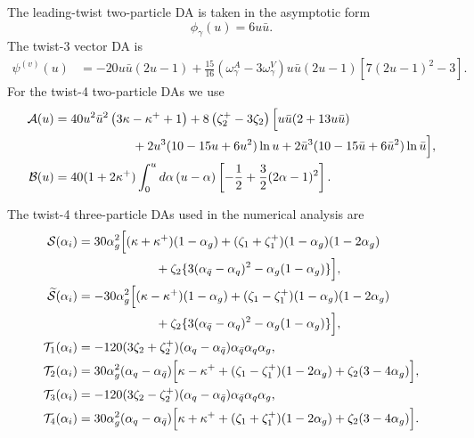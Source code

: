 \documentclass[aps,prd,preprint,nofootinbib,superscriptaddress]{revtex4-2}
\begin{document}
The leading-twist two-particle DA is taken in the asymptotic form
\begin{equation}
  \phi_\gamma(u)=6u\bar u .
  \label{eq:app-phi}
\end{equation}
The twist-3 vector DA is
\begin{align}
  \psi^{(v)}(u)
  &=
  -20u\bar u(2u-1)
  +\frac{15}{16}\left(\omega_\gamma^A-3\omega_\gamma^V\right)
  u\bar u(2u-1)\left[7(2u-1)^2-3\right].
  \label{eq:app-psiv}
\end{align}
For the twist-4 two-particle DAs we use
\begin{align}
  {\cal A}(u)
  &=
  40u^2\bar u^2\left(3\kappa-\kappa^+ +1\right)
  +8\left(\zeta_2^+-3\zeta_2\right)
  \Big[
  u\bar u(2+13u\bar u)
  \notag\\
  &\hspace{2.2cm}
  +2u^3(10-15u+6u^2)\ln u
  +2\bar u^3(10-15\bar u+6\bar u^2)\ln\bar u
  \Big],
  \label{eq:app-A}\\
  {\cal B}(u)
  &=
  40(1+2\kappa^+)
  \int_0^u d\alpha\,(u-\alpha)
  \left[-\frac12+\frac32(2\alpha-1)^2\right].
  \label{eq:app-B}
\end{align}

The twist-4 three-particle DAs used in the numerical analysis are
\begin{align}
  {\cal S}(\alpha_i)
  &=
  30\alpha_g^2
  \Big[
  (\kappa+\kappa^+)(1-\alpha_g)
  +(\zeta_1+\zeta_1^+)(1-\alpha_g)(1-2\alpha_g)
  \notag\\
  &\hspace{2.2cm}
  +\zeta_2\{3(\alpha_{\bar q}-\alpha_q)^2-\alpha_g(1-\alpha_g)\}
  \Big],
  \label{eq:app-S}\\
  \widetilde{\cal S}(\alpha_i)
  &=
  -30\alpha_g^2
  \Big[
  (\kappa-\kappa^+)(1-\alpha_g)
  +(\zeta_1-\zeta_1^+)(1-\alpha_g)(1-2\alpha_g)
  \notag\\
  &\hspace{2.2cm}
  +\zeta_2\{3(\alpha_{\bar q}-\alpha_q)^2-\alpha_g(1-\alpha_g)\}
  \Big],
  \label{eq:app-Stilde}\\
  {\cal T}_1(\alpha_i)
  &=
  -120(3\zeta_2+\zeta_2^+)
  (\alpha_q-\alpha_{\bar q})\alpha_{\bar q}\alpha_q\alpha_g,
  \label{eq:app-T1}\\
  {\cal T}_2(\alpha_i)
  &=
  30\alpha_g^2(\alpha_q-\alpha_{\bar q})
  \Big[
  \kappa-\kappa^+
  +(\zeta_1-\zeta_1^+)(1-2\alpha_g)
  +\zeta_2(3-4\alpha_g)
  \Big],
  \label{eq:app-T2}\\
  {\cal T}_3(\alpha_i)
  &=
  -120(3\zeta_2-\zeta_2^+)
  (\alpha_q-\alpha_{\bar q})\alpha_{\bar q}\alpha_q\alpha_g,
  \label{eq:app-T3}\\
  {\cal T}_4(\alpha_i)
  &=
  30\alpha_g^2(\alpha_q-\alpha_{\bar q})
  \Big[
  \kappa+\kappa^+
  +(\zeta_1+\zeta_1^+)(1-2\alpha_g)
  +\zeta_2(3-4\alpha_g)
  \Big].
  \label{eq:app-T4}
\end{align}
\end{document}
